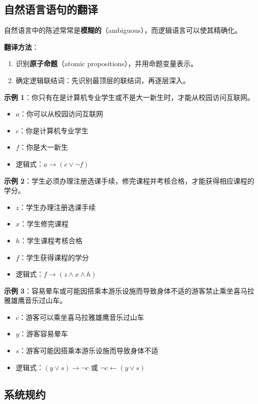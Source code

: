 \documentclass[UTF8,11pt,a4paper]{ctexbook}   %
\theoremstyle{definition}
\begin{document}
\subsection{自然语言语句的翻译}

自然语言中的陈述常常是\textbf{模糊的}（ambiguous），而逻辑语言可以使其精确化。

\textbf{翻译方法}：
\begin{enumerate}
    \item 识别\textbf{原子命题}（atomic propositions），并用命题变量表示。
    \item 确定逻辑联结词：先识别最顶层的联结词，再逐层深入。
\end{enumerate}

\textbf{示例 1}：你只有在是计算机专业学生或不是大一新生时，才能从校园访问互联网。
\begin{itemize}
    \item $a$：你可以从校园访问互联网
    \item $c$：你是计算机专业学生
    \item $f$：你是大一新生
    \item 逻辑式：$a \rightarrow (c \lor \neg f)$
\end{itemize}

\textbf{示例 2}：学生必须办理注册选课手续，修完课程并考核合格，才能获得相应课程的学分。
\begin{itemize}
    \item $z$：学生办理注册选课手续
    \item $x$：学生修完课程
    \item $h$：学生课程考核合格
    \item $f$：学生获得课程的学分
    \item 逻辑式：$f \rightarrow (z \land x \land h)$
\end{itemize}

\textbf{示例 3}：容易晕车或可能因搭乘本游乐设施而导致身体不适的游客禁止乘坐喜马拉雅雄鹰音乐过山车。
\begin{itemize}
    \item $c$：游客可以乘坐喜马拉雅雄鹰音乐过山车
    \item $y$：游客容易晕车
    \item $s$：游客可能因搭乘本游乐设施而导致身体不适
    \item 逻辑式：$(y \lor s) \rightarrow \neg c$ 或 $\neg c \leftarrow (y \lor s)$
\end{itemize}

\subsection{系统规约}
\end{document}

